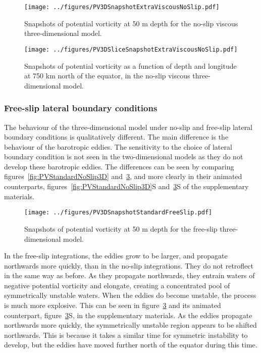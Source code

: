 \begin{figure} 
    \centering
    \texttt{[image: ../figures/PV3DSnapshotExtraViscousNoSlip.pdf]}
    \caption{Snapshots of potential vorticity at 50 m depth for the no-slip viscous three-dimensional model.}
    \label{fig:PV3DSnapshotViscousNoSlip}
\end{figure}

\begin{figure} 
    \centering
    \texttt{[image: ../figures/PV3DSliceSnapshotExtraViscousNoSlip.pdf]}
    \caption{Snapshots of potential vorticity as a function of depth and longitude at 750 km north of the equator, in the no-slip viscous three-dimensional model.}
    \label{fig:PVatFixedLatForViscous3D}
\end{figure}

\subsubsection{Free-slip lateral boundary conditions}
The behaviour of the three-dimensional model under no-slip and free-slip lateral boundary conditions is qualitatively different. The main difference is the behaviour of the barotropic eddies. The sensitivity to the choice of lateral boundary condition is not seen in the two-dimensional models as they do not develop these barotropic eddies. The differences can be seen by comparing figures~\ref{fig:PVStandardNoSlip3D} and~\ref{fig:PV3DSnapshotStandardFreeSlip}, and more clearly in their animated counterparts, figures~\ref{fig:PVStandardNoSlip3D}S and~\ref{fig:PV3DSnapshotStandardFreeSlip}S of the supplementary materials. 

\begin{figure} 
    \centering
    \texttt{[image: ../figures/PV3DSnapshotStandardFreeSlip.pdf]}
    \caption{Snapshots of potential vorticity at 50 m depth for the free-slip three-dimensional model.}
    \label{fig:PV3DSnapshotStandardFreeSlip}
\end{figure}

In the free-slip integrations, the eddies grow to be larger, and propagate northwards more quickly, than in the no-slip integrations. They do not retroflect in the same way as before. As they propagate northwards, they entrain waters of negative potential vorticity and elongate, creating a concentrated pool of symmetrically unstable waters. When the eddies do become unstable, the process is much more explosive. This can be seen in figure~\ref{fig:PV3DSnapshotStandardFreeSlip} and its animated counterpart, figure~\ref{fig:PV3DSnapshotStandardFreeSlip}S, in the supplementary materials. As the eddies propagate northwards more quickly, the symmetrically unstable region appears to be shifted northwards. This is because it takes a similar time for symmetric instability to develop, but the eddies have moved further north of the equator during this time.

